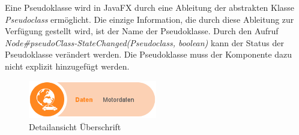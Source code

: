 Eine Pseudoklasse wird in JavaFX durch eine Ableitung der abstrakten Klasse \textit{Pseudoclass} ermöglicht. Die einzige Information, die durch diese Ableitung zur Verfügung gestellt wird, ist der Name der Pseudoklasse. Durch den Aufruf \textit{Node\#{}pseudoClass-StateChanged(Pseudoclass, boolean)} kann der Status der Pseudoklasse verändert werden. Die Pseudoklasse muss der Komponente dazu nicht explizit hinzugefügt werden.\par
\begin{figure}[H]
 \centering
 \includegraphics[width=0.5\textwidth]{grafiken/detailPage_bold.png}
 \caption{Detailansicht Überschrift}
 \label{fig:detailPageBold}
\end{figure}
